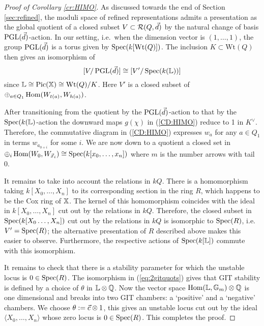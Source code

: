\documentclass[12pt]{amsart}
\begin{document}
\begin{proof}[Proof of Corollary \ref{cr:HIMO}]
As discussed towards the end of Section \ref{sec:refined}, the moduli space of refined representations admits a presentation as the global quotient of a closed subset $V \subset \mathcal{R}(Q, \vec{d})$ by the natural change of basis $\operatorname{PGL}(\vec{d})$-action.
In our setting, i.e.\ when the dimension vector is $(1,\ldots,1)$, the group $\operatorname{PGL}(\vec{d})$ is a torus given by $\operatorname{Spec}(k[\text{Wt}(Q)])$. The inclusion $K \subset \text{Wt}(Q)$ then gives an isomorphism of \begin{equation}\label{eq:2gitquots}[V/\operatorname{PGL}(\vec{d})] \cong [V'/\operatorname{Spec}(k(\mathbb{L}))]\end{equation} since $\mathbb{L} \cong \operatorname{Pic}(\mathbb{X}) \cong \text{Wt}(Q)/K$. 
Here $V'$ is a closed subset of $\oplus_{a \in Q_1} \operatorname{Hom}(W_{t(a)}, W_{h(a)})$.

After transitioning from the quotient by the $\operatorname{PGL}(\vec{d})$-action to that by the $\operatorname{Spec}(k(\mathbb{L})$-action the downward maps $g(\chi)$ in (\ref{CD:HIMO}) reduce to 1 in $K^\vee$. 
Therefore, the commutative diagram in (\ref{CD:HIMO}) expresses $w_a$ for any $a \in Q_1$ in terms $w_{a_{0+i}}$ for some $i$. 
We are now down to a quotient a closed set in $\oplus_i \operatorname{Hom}(W_0, W_{{\vec{x}}_i}) \cong \operatorname{Spec}(k[x_0, \ldots, x_n])$ where $m$ is the number arrows with tail $0$. 

It remains to take into account the relations in $kQ$. 
There is a homomorphism taking $k[X_0, \ldots, X_n]$ to its corresponding section in the ring $R$, which happens to be the Cox ring of $\mathbb{X}$.
The kernel of this homomorphism coincides with the ideal in $k[X_0, \ldots, X_n]$ cut out by the relations in $kQ$. 
Therefore, the closed subset in $\operatorname{Spec}(k[X_0 \ldots, X_n])$ cut out by the relations in $kQ$ is isomorphic to $\operatorname{Spec}(R)$, i.e.\ $V' = \operatorname{Spec}(R)$; the alternative presentation of $R$ described above makes this easier to observe. Furthermore, the respective actions of $\operatorname{Spec}(k[\mathbb{L}])$ commute with this isomorphism.

It remains to check that there is a stability parameter for which the unstable locus is $0 \in \operatorname{Spec}(R)$. 
The isomorphism in (\ref{eq:2gitquots}) gives that GIT stability is defined by a choice of $\theta$ in $\mathbb{L} \otimes \mathbb{Q}$. 
Now the vector space $\operatorname{Hom}(\mathbb{L}, \mathbb{G}_m) \otimes \mathbb{Q}$ is one dimensional and breaks into two GIT chambers: a `positive' and a `negative' chambers. 
We choose $\theta:= {\vec{c}} \otimes 1$, this gives an unstable locus cut out by the ideal $\langle X_0, \ldots, X_n\rangle$ whose zero locus is $0 \in \operatorname{Spec}(R)$.
This completes the proof.
\end{proof}
\end{document}
